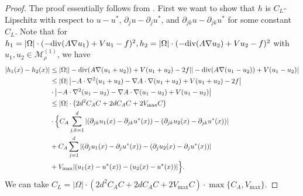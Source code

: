 \documentclass{article}
\renewcommand{\div}{\textnormal{div}}
\theoremstyle{plain}
\theoremstyle{definition}
\theoremstyle{remark}
\begin{document}
    \begin{proof}
        The proof essentially follows from \citep[Lemma A.27]{lu2021machine}. First we want to show that $h$ is $C_L$-Lipschitz with respect to $u-u^*$, $\partial_j u - \partial_j u^*$, and $\partial_{jk} u - \partial_{jk} u^*$ for some constant $C_L$. 
        Note that for $h_1 = |\Omega| \cdot (-\div(A \nabla u_1) + V u_1  -f )^2, h_2=|\Omega| \cdot (-\div(A \nabla u_2) + V u_2  -f )^2$ with $u_1, u_2 \in \mathcal{M}_\rho^{(1)}$, we have 
        \begin{align*}
             |h_1(x) - h_2 (x)| & \leq  |\Omega| |-\div(A \nabla (u_1 + u_2)) + V (u_1 + u_2)  - 2f | |-\div(A \nabla (u_1 - u_2)) + V (u_1 - u_2) |   \\
            & \leq |\Omega| \left|-A \cdot \nabla^2 (u_1 + u_2) - \nabla A \cdot \nabla (u_1 + u_2) + V(u_1 + u_2) - 2f\right| \\
            & \cdot  \left|-A \cdot \nabla^2 (u_1 - u_2) - \nabla A \cdot \nabla (u_1 - u_2) + V(u_1 - u_2) \right|\\
            & \leq |\Omega| \cdot \left(2 d^2 C_A C + 2 d C_A C + 2 V_{\text{max}} C\right) \\
            & \cdot \Big\{ C_A  \sum_{j,k=1}^d |(\partial_{jk} u_1(x) - \partial_{jk} u^*(x)) -(\partial_{jk} u_2(x) - \partial_{jk} u^*(x))|   \\
            & + C_A \sum_{j=1}^d | (\partial_j u_1(x) - \partial_j u^*(x)) - (\partial_j u_2(x) - \partial_j u^*(x))| \\ &  + V_{\text{max}} |( u_1(x) -  u^*(x))  - ( u_2(x) -  u^*(x)) | \Big\}.
        \end{align*}
        We can take $C_L = |\Omega| \cdot \left(2 d^2 C_A C + 2 d C_A C + 2 V_{\text{max}} C\right) \cdot \max\{C_A, V_{\text{max}}\}.$


\end{proof}
\end{document}

